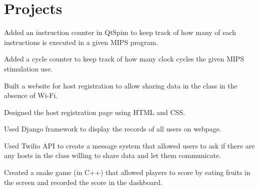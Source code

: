 \documentclass[]{deedy-resume-reversed}
\begin{document}
\begin{minipage}[t]{0.60\textwidth}

\section{Projects}
{}
\begin{tightemize}
\item Added an instruction counter in QtSpim to keep track of how many of each instructions is executed in a given MIPS program.
\item Added a cycle counter to keep track of how many clock cycles the given MIPS stimulation use.
\end{tightemize}
\sectionsep

\begin{tightemize}
\item Built a website for host registration to allow sharing data in the class in the absence of Wi-Fi. 
\item Designed the host registration page using HTML and CSS.
\item Used Django framework to display the records of all users on webpage.
\item Used Twilio API to create a message system that allowed users to ask if there are any hosts in the class willing to share data and let them communicate.
\end{tightemize}
\sectionsep

\begin{tightemize}
\item Created a snake game (in C++) that allowed players to score by eating fruits in the screen and recorded the score in the dashboard.
\end{tightemize}
\sectionsep


\end{minipage}
\end{document}
